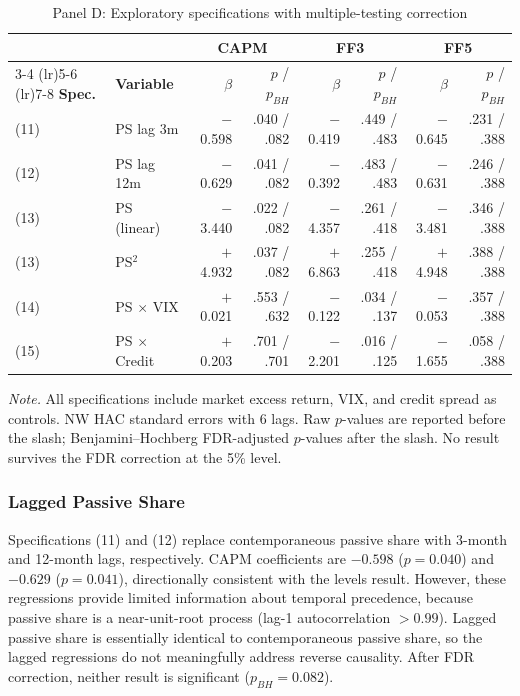 \documentclass[11pt, a4paper]{article}
\begin{document}
\begin{table}[H]
\centering
\caption{Panel D: Exploratory specifications with multiple-testing correction}
\label{tab:panel_d}
\small
\begin{tabular}{llrrrrrr}
\toprule
 & & \multicolumn{2}{c}{\textbf{CAPM}} & \multicolumn{2}{c}{\textbf{FF3}} & \multicolumn{2}{c}{\textbf{FF5}} \\
\cmidrule(lr){3-4} \cmidrule(lr){5-6} \cmidrule(lr){7-8}
\textbf{Spec.} & \textbf{Variable} & $\beta$ & $p$ / $p_{BH}$ & $\beta$ & $p$ / $p_{BH}$ & $\beta$ & $p$ / $p_{BH}$ \\
\midrule
(11) & PS lag 3m     & $-$0.598 & .040 / .082 & $-$0.419 & .449 / .483 & $-$0.645 & .231 / .388 \\
(12) & PS lag 12m    & $-$0.629 & .041 / .082 & $-$0.392 & .483 / .483 & $-$0.631 & .246 / .388 \\
(13) & PS (linear)   & $-$3.440 & .022 / .082 & $-$4.357 & .261 / .418 & $-$3.481 & .346 / .388 \\
(13) & PS$^2$        & $+$4.932 & .037 / .082 & $+$6.863 & .255 / .418 & $+$4.948 & .388 / .388 \\
(14) & PS $\times$ VIX     & $+$0.021 & .553 / .632 & $-$0.122 & .034 / .137 & $-$0.053 & .357 / .388 \\
(15) & PS $\times$ Credit  & $+$0.203 & .701 / .701 & $-$2.201 & .016 / .125 & $-$1.655 & .058 / .388 \\
\bottomrule
\end{tabular}
\begin{flushleft}
\small\textit{Note.} All specifications include market excess return, VIX, and credit spread as controls. NW HAC standard errors with 6 lags. Raw $p$-values are reported before the slash; Benjamini--Hochberg FDR-adjusted $p$-values after the slash. No result survives the FDR correction at the 5\% level.
\end{flushleft}
\end{table}

\subsubsection{Lagged Passive Share}

Specifications (11) and (12) replace contemporaneous passive share with 3-month and 12-month lags, respectively. CAPM coefficients are $-0.598$ ($p = 0.040$) and $-0.629$ ($p = 0.041$), directionally consistent with the levels result. However, these regressions provide limited information about temporal precedence, because passive share is a near-unit-root process (lag-1 autocorrelation $>0.99$). Lagged passive share is essentially identical to contemporaneous passive share, so the lagged regressions do not meaningfully address reverse causality. After FDR correction, neither result is significant ($p_{BH} = 0.082$).
\end{document}
